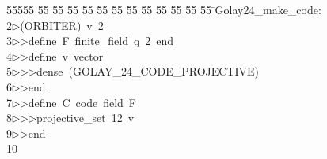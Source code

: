 %
%
\begin{tabbing}
55555 \= 55 \= 55 \= 55 \= 55 \= 55 \= 55 \= 55 \= 55 \= 55 \= 55 \= 55 \= 55 \= \>Golay24\_make\_code:\\[0pt]
2\>$\triangleright$\>(ORBITER)\ v\ 2\ \\[0pt]
3\>$\triangleright$\>$\triangleright$\>define\ F\ finite\_field\ q\ 2\ end\ \\[0pt]
4\>$\triangleright$\>$\triangleright$\>define\ v\ vector\ \\[0pt]
5\>$\triangleright$\>$\triangleright$\>$\triangleright$\>dense\ (GOLAY\_24\_CODE\_PROJECTIVE)\ \\[0pt]
6\>$\triangleright$\>$\triangleright$\>end\ \\[0pt]
7\>$\triangleright$\>$\triangleright$\>define\ C\ code\ field\ F\ \\[0pt]
8\>$\triangleright$\>$\triangleright$\>$\triangleright$\>projective\_set\ 12\ v\ \\[0pt]
9\>$\triangleright$\>$\triangleright$\>end\ \\[0pt]
10\>\end{tabbing}
